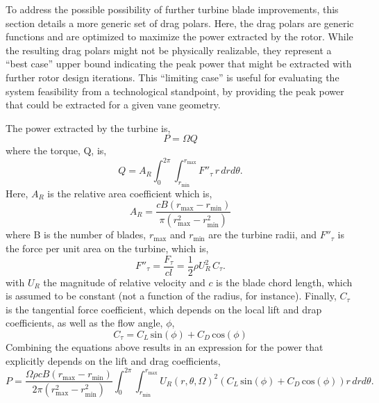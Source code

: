 To address the possible possibility of further turbine blade
improvements, this section details a more generic set of drag
polars. Here, the drag polars are generic functions and are optimized to
maximize the power extracted by the rotor. While the resulting drag
polars might not be physically  realizable, they represent a ``best
case'' upper bound indicating the peak power that might be extracted
with further rotor design iterations. This ``limiting case'' is useful
for evaluating the system feasibility from a technological standpoint,
by providing the peak power that could be extracted for a given vane
geometry. 

The power extracted by the turbine is, 
\begin{equation}
 P = \Omega Q
\end{equation}
where the torque, Q, is, 
\begin{equation}
 Q = A_R \int_0^{2\pi} \int_{r_{\text{min}}}^{r_{\text{max}}} F''_{\tau}\, r\, dr d\theta.
\end{equation}
Here, $A_R$ is the relative area coefficient which is, 
\begin{equation}
A_R = \frac{c B (r_{\text{max}}-r_{\text{min}})}{\pi(r_{\text{max}}^2-r_{\text{min}}^2)}
\end{equation}
where B is the number of blades, $r_{\text{max}}$ and $r_{\text{min}}$
are the turbine radii, and $F''_{\tau}$ is the force per unit
area on the turbine, which is, 
\begin{equation}
 F''_{\tau} = \frac{F_{\tau}}{cl}= \frac{1}{2}\rho U_R^2 \, C_{\tau}.
\end{equation}
with $U_R$ the magnitude of relative velocity and $c$ is the blade chord
length, which is assumed to be constant (not a function of the radius,
for instance). Finally, $C_{\tau}$ is the tangential force coefficient,
which depends on the local lift and drap coefficients, as well as the
flow angle, $\phi$, 
\begin{equation}
 C_{\tau} = C_L \,\text{sin}(\phi) + C_D \,\text{cos}(\phi)
\end{equation}
Combining the equations above results in an expression for the power
that explicitly depends on the lift and drag coefficients, 
\begin{equation*}
 P = \frac{\Omega \rho c B (r_{\text{max}}-r_{\text{min}})}{2 \pi(r_{\text{max}}^2-r_{\text{min}}^2)}
\int_0^{2\pi}
\int_{r_{\text{min}}}^{r_{\text{max}}} U_R(r,\theta,\Omega)^2 \left(C_L
						     \,\text{sin}(\phi)
						     + C_D
						     \,\text{cos}(\phi)
						    \right) r\,dr d\theta. 
\end{equation*}
